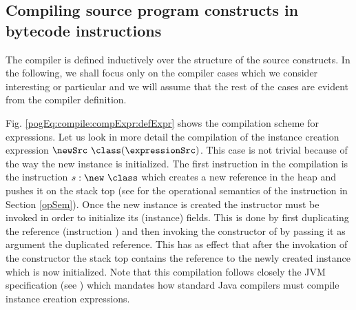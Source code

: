 

\subsection{Compiling source program  constructs in bytecode instructions} \label{pogEq:compile:compExpr} 

 The compiler is defined inductively over the structure of the source constructs. 
 In the following, we shall focus only on the compiler cases which we consider 
 interesting or particular and we will assume that the rest of the cases are evident 
 from the compiler definition.

 Fig. \ref{pogEq:compile:compExpr:defExpr} shows the compilation scheme for expressions.
 Let us look in more detail the compilation of  the instance creation expression
 $\newSrc \ \class  (\expressionSrc )$.
 This case is not trivial because of the way the new instance is initialized.
 The first instruction in the compilation is the instruction $s : \new \ \class$ which 
 creates a new reference in the heap and pushes it on the stack top 
 (see for the operational semantics of the instruction in Section \ref{opSem}). 
 Once the new instance is created the instructor must be invoked in order to initialize
 its (instance) fields. This is done by first duplicating the reference (instruction \dup) and then invoking the constructor \Constructor{\class}
 of \class{} by passing it as argument the duplicated reference. 
 This has as effect that after the invokation of the constructor the stack top contains 
 the reference to the newly created instance which is
 now initialized. Note that this compilation follows closely 
 the JVM specification (see \cite[\S 7.8]{VMSpec}) which mandates 
 how standard Java compilers must compile instance creation expressions.  
  


